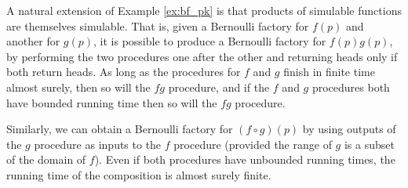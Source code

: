 \documentclass{article}
\theoremstyle{definition}
\begin{document}
A natural extension of Example \ref{ex:bf_pk} is that products of simulable functions are themselves simulable. That is, given a Bernoulli factory for $f(p)$ and another for $g(p)$, it is possible to produce a Bernoulli factory for $f(p)g(p)$, by performing the two procedures one after the other and returning heads only if both return heads.
As long as the procedures for $f$ and $g$ finish in finite time almost surely, then so will the $f g$ procedure, and if the $f$ and $g$ procedures both have bounded running time then so will the $f g$ procedure.

Similarly, we can obtain a Bernoulli factory for $(f \circ g) (p)$ by using outputs of the $g$ procedure as inputs to the $f$ procedure (provided the range of $g$ is a subset of the domain of $f$). Even if both procedures have unbounded running times, the running time of the composition is almost surely finite.
\end{document}
